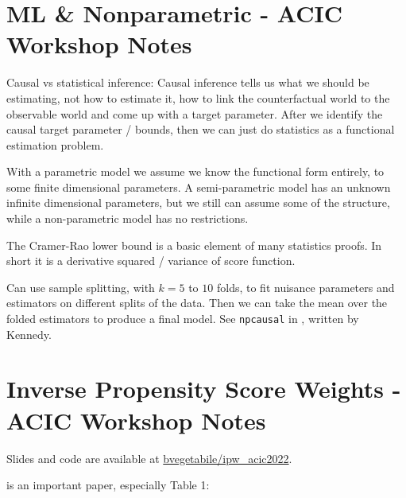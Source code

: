 \section{ML \& Nonparametric - ACIC Workshop Notes}
\label{cause:ml_nonparametric_ACIC}

Causal vs statistical inference:
Causal inference tells us what we should be estimating, not how to estimate it,
\ie how to link the counterfactual world to the observable world and come up with a target parameter.
After we identify the causal target parameter / bounds, then we can just do statistics as a functional estimation problem.

With a parametric model we assume we know the functional form entirely, to some finite dimensional parameters.
A semi-parametric model has an unknown infinite dimensional parameters, but we still can assume some of the structure,
while a non-parametric model has no restrictions.

The Cramer-Rao lower bound is a basic element of many statistics proofs. In short it is a derivative squared / variance of score function.

Can use sample splitting, with $k=5$ to $10$ folds, to fit nuisance parameters and estimators on different splits of the data.
Then we can take the mean over the folded estimators to produce a final model.
See \texttt{npcausal} in \R, written by Kennedy.

\section{Inverse Propensity Score Weights - ACIC Workshop Notes}
\label{cause:inverse_propensity_score_weights_ACIC}

Slides and \R code are available at \href{https://www.github.com/bvegetabile/ipw_acic2022}{bvegetabile/ipw\_acic2022}.

\cite{Li_2017} is an important paper, especially Table 1:

